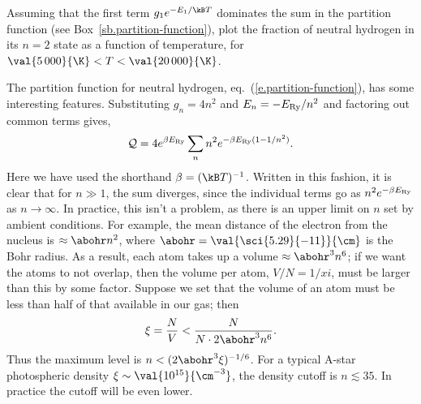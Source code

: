 \begin{exercisebox}
Assuming that the first term $g_{1}e^{-E_{1}/\kB T}$ dominates the sum in the partition function (see Box~\ref{sb.partition-function}), plot the fraction of neutral hydrogen in its $n=2$ state as a function of temperature, for $\val{5\,000}{\K} < T < \val{20\,000}{\K}$.
\end{exercisebox}

\begin{sidebar}
\label{sb.partition-function}
The partition function for neutral hydrogen, eq.~(\ref{e.partition-function}), has some interesting features. Substituting $g_{n}=4n^{2}$ and $E_{n} = -E_{\mathrm{Ry}}/n^{2}$ and factoring out common terms gives,
\[	\mathcal{Q} = 4e^{\beta E_{\mathrm{Ry}}}\sum_{n} n^{2} e^{-\beta E_{\mathrm{Ry}}(1-1/n^{2})}. \]
Here we have used the shorthand $\beta = (\kB T)^{-1}$. Written in this fashion, it is clear that for $n\gg 1$, the sum diverges, since the individual terms go as $n^{2}e^{-\beta E_{\mathrm{Ry}}}$ as $n\to\infty$. In practice, this isn't a problem, as there is an upper limit on $n$ set by ambient conditions. For example, the mean distance of the electron from the nucleus is $\approx \abohr n^{2}$, where $\abohr = \val{\sci{5.29}{-11}}{\cm}$ is the Bohr radius. As a result, each atom takes up a volume $\approx \abohr^{3}n^{6}$; if we want the atoms to not overlap, then the volume per atom, $V/N = 1/xi$, must be larger than this by some factor. Suppose we set that the volume of an atom must be less than half of that available in our gas; then
\[
\xi = \frac{N}{V} < \frac{N}{N\cdot 2\abohr^{3}n^{6}}.
\]
Thus the maximum level is $n < (2\abohr^{3}\xi)^{-1/6}$. For a typical A-star photospheric density $\xi\sim \val{10^{15}}{\cm^{-3}}$, the density cutoff is $n \lesssim 35$. In practice the cutoff will be even lower.


\end{sidebar}

